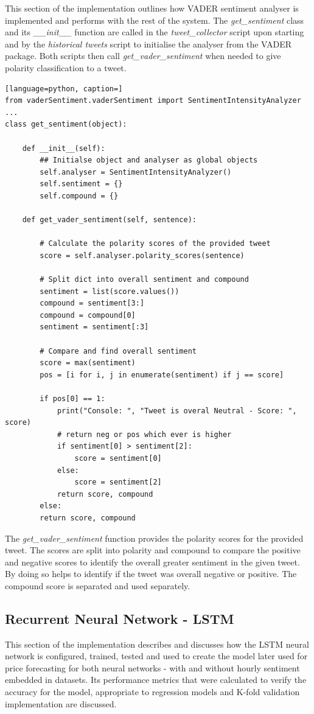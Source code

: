 \documentclass[oneside, 12pt]{article}
\begin{document}
		This section of the implementation outlines how VADER sentiment analyser is implemented and performs with the rest of the system. The \textit{get\_sentiment} class and its \textit{\_\_init\_\_} function are called in the \textit{tweet\_collector} script upon starting and by the \textit{historical tweets} script to initialise the analyser from the VADER package. Both scripts then call \textit{get\_vader\_sentiment} when needed to give polarity classification to a tweet.
		
		\begin{lstlisting}[language=python, caption=]
from vaderSentiment.vaderSentiment import SentimentIntensityAnalyzer
...
class get_sentiment(object):

	def __init__(self):
		## Initialse object and analyser as global objects
		self.analyser = SentimentIntensityAnalyzer()
		self.sentiment = {}
		self.compound = {}
		
	def get_vader_sentiment(self, sentence):
	
		# Calculate the polarity scores of the provided tweet
		score = self.analyser.polarity_scores(sentence)
		
		# Split dict into overall sentiment and compound
		sentiment = list(score.values())
		compound = sentiment[3:]
		compound = compound[0]
		sentiment = sentiment[:3]
		
		# Compare and find overall sentiment
		score = max(sentiment)
		pos = [i for i, j in enumerate(sentiment) if j == score]
		
		if pos[0] == 1:
			print("Console: ", "Tweet is overal Neutral - Score: ", score)
			# return neg or pos which ever is higher
			if sentiment[0] > sentiment[2]:
				score = sentiment[0]
			else:
				score = sentiment[2]
			return score, compound
		else:
		return score, compound
		\end{lstlisting}
		
		The \textit{get\_vader\_sentiment} function provides the polarity scores for the provided tweet. The scores are split into polarity and compound to compare the positive and negative scores to identify the overall greater sentiment in the given tweet. By doing so helps to identify if the tweet was overall negative or positive. The compound score is separated and used separately.
		
		\newpage
			
		\subsection{Recurrent Neural Network - LSTM}
		This section of the implementation describes and discusses how the LSTM neural network is configured, trained, tested and used to create the model later used for price forecasting for both neural networks - with and without hourly sentiment embedded in datasets. Its performance metrics that were calculated to verify the accuracy for the model, appropriate to regression models and K-fold validation implementation are discussed.	
		
\end{document}
